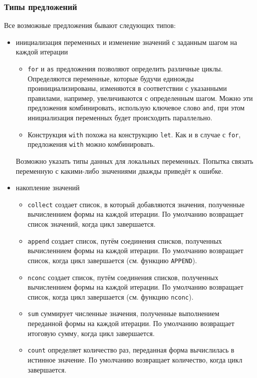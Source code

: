 \subsubsection{Типы предложений}
Все возможные предложения бывают следующих типов:
\begin{itemize}
  \item инициализация переменных и изменение значений с заданным шагом на каждой итерации
    \begin{itemize}
      \item \lstinline{for} и \lstinline{as} предложения позволяют определить различные циклы. Определяются переменные, которые будучи единожды проинициализированы, изменяются в соответствии с указанными правилами, например, увеличиваются с определенным шагом. Можно эти предложения комбинировать, использую ключевое слово \lstinline{and}, при этом инициализация переменных будет происходить параллельно.
      \item Конструкция \lstinline{with} похожа на конструкцию \lstinline{let}. Как и в случае с \lstinline{for}, предложения \lstinline{with} можно комбинировать.
    \end{itemize}
    Возможно указать типы данных для локальных переменных. Попытка связать переменную с какими-либо значениями дважды приведёт к ошибке.
  \item накопление значений
    \begin{itemize}
      \item \lstinline{collect} создает список, в который добавляются значения, полученные вычисленнием формы на каждой итерации. По умолчанию возвращает список значений, когда цикл завершается.
      \item \lstinline{append} создает список, путём соединения списков, полученных вычисленнием формы на каждой итерации. По умолчанию возвращает список, когда цикл завершается (см. функцию \lstinline{APPEND}).
      \item \lstinline{nconc} создает список, путём соединения списков, полученных вычисленнием формы на каждой итерации. По умолчанию возвращает список, когда цикл завершается (см. функцию \lstinline{nconc}).
      \item \lstinline{sum} суммирует численные значения, полученные выполнением переданной формы на каждой итерации. По умолчанию возвращает итоговую сумму, когда цикл завершается.
      \item \lstinline{count} определяет количество раз, переданная форма вычислилась в истинное значение. По умолчанию возвращает количество, когда цикл завершается.

\end{itemize}
\end{itemize}
